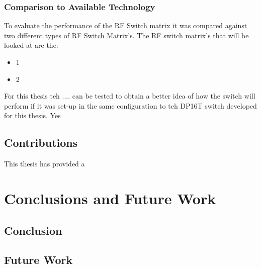 \documentclass[12pt,openany,a4paper]{book}
\begin{document}
\subsection{Comparison to Available Technology}
To evaluate the performance of the RF Switch matrix it was compared against two different types of RF Switch Matrix's. The RF switch matrix's that will be looked at are the:
\begin{itemize}
	\setlength\itemsep{-0.5em}
	\item 1
	\item 2
\end{itemize}
For this thesis teh .... can be tested to obtain a better idea of how the switch will perform if it was set-up in the same configuration to teh DP16T switch developed for this thesis. Yes

\section{Contributions}
This thesis has provided a 













\chapter{Conclusions and Future Work}

\section{Conclusion}




\section{Future Work}



\end{document}
